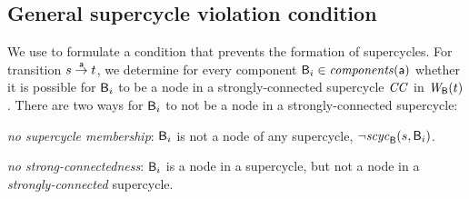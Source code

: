 
\subsection{General supercycle violation condition}

We use  to formulate a condition that prevents the formation of
supercycles. 
For transition $s \goesto[\act] t$, we determine for every component $\B_i \in \cmps{\act}$ whether
it is possible for $\B_i$ to be a node in a strongly-connected supercycle $\CC$ in $\wfg{\B}{t}$. 
There are two ways for $\B_i$ to not be a node in a strongly-connected supercycle:
\bn
\item \textit{no supercycle membership}: $\B_i$ is not a node of any supercycle, \ie $\neg \scyc{\B}{s}{\B_i}$.

\item \textit{no strong-connectedness}: $\B_i$ is a node in a supercycle, but not a node in a \emph{strongly-connected} supercycle. 

\en



